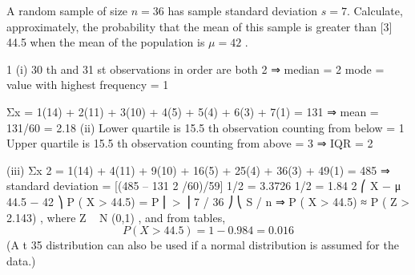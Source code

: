 \documentclass[a4paper,12pt]{article}
\begin{document}
\item A random sample of size $n = 36$ has sample standard deviation $s = 7$.
Calculate, approximately, the probability that the mean of this sample is greater than
[3]
44.5 when the mean of the population is $\mu = 42$ .


1
(i)
30 th and 31 st observations in order are both 2 ⇒ median = 2
mode = value with highest frequency = 1

Σx = 1(14) + 2(11) + 3(10) + 4(5) + 5(4) + 6(3) + 7(1) = 131
⇒ mean = 131/60 = 2.18
(ii)
Lower quartile is 15.5 th observation counting from below = 1
Upper quartile is 15.5 th observation counting from above = 3
⇒ IQR = 2

(iii)
Σx 2 = 1(14) + 4(11) + 9(10) + 16(5) + 25(4) + 36(3) + 49(1) = 485
⇒ standard deviation = [(485 – 131 2 /60)/59] 1/2 = 3.3726 1/2 = 1.84
2
⎛ X − μ 44.5 − 42 ⎞
P ( X > 44.5) = P ⎜
>
⎟
7 / 36 ⎠
⎝ S / n
⇒ P ( X > 44.5) ≈ P ( Z > 2.143) , where Z ~ N (0,1) ,
and from tables,
\[P ( X > 44.5) = 1 − 0.984 = 0.016\]
(A t 35 distribution can also be used if a normal distribution is assumed for the data.)
\end{document}
